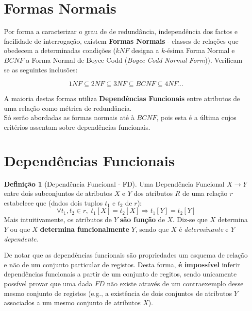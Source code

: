 \documentclass[oneside]{book}
\theoremstyle{definition}
\newtheorem{definition}{Definição}
\begin{document}
\section{Formas Normais}

Por forma a caracterizar o grau de de redundância, independência dos factos e facilidade de interrogação, existem \textbf{Formas Normais} - classes de relações que obedecem a determinadas condições ($kNF$ designa a $k$-ésima Forma Normal e $BCNF$ a Forma Normal de Boyce-Codd (\textit{Boyce-Codd Normal Form})). Verificam-se as seguintes inclusões:

\begin{equation}
    1NF \subseteq 2NF \subseteq 3NF \subseteq BCNF \subseteq 4NF ... 
\end{equation}

A maioria destas formas utiliza \textbf{Dependências Funcionais} entre atributos de uma relação como métrica de redundância.\\
Só serão abordadas as formas normais até à $BCNF$, pois esta é a última cujos critérios assentam sobre dependências funcionais.

\section{Dependências Funcionais}

\begin{definition}[Dependência Funcional - FD]
    Uma Dependência Funcional $X\rightarrow Y$ entre dois subconjuntos de atributos $X$ e $Y$ dos atributos $R$ de uma relação $r$ estabelece que (dados dois tuplos $t_1$ e $t_2$ de $r$):
    \begin{equation*}
        \forall t_1, t_2 \in r, \;t_1[X] = t_2[X] \Rightarrow t_1[Y] = t_2[Y]
    \end{equation*}
    Mais intuitivamente, os atributos de $Y$  \textbf{são função} de $X$. Diz-se que $X$ determina $Y$ ou que $X$ \textbf{determina funcionalmente} $Y$, sendo que $X$ é \textit{determinante} e $Y$ \textit{dependente}.
\end{definition} 

De notar que as dependências funcionais são propriedades um esquema de relação e não de um conjunto particular de registos. Desta forma, \textbf{é impossível} inferir dependências funcionais a partir de um conjunto de regitos, sendo unicamente possível provar que uma dada $FD$ não existe através de um contraexemplo desse mesmo conjunto de registos (e.g., a existência de dois conjuntos de atributos $Y$ associados a um mesmo conjunto de atributos $X$).
\end{document}
